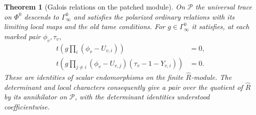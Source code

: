 \documentclass[a4paper,11pt]{article}
\newtheorem{theorem}[proposition]{Theorem}
\theoremstyle{definition}
\theoremstyle{remark}
\numberwithin{equation}{section}
\begin{document}
\begin{theorem}[Galois relations on the patched module]\leavevmode
\label{thm:patchrelations408}
On \(\mathcal P\) the universal trace on \(\Phi^0\) descends
to \(\Gamma_\infty^0\) and satisfies the polarized ordinary
relations with its limiting local maps and the old tame
conditions. For \(g\in\Gamma_\infty^0\) it satisfies, at
each marked pair \(\phi_v,\tau_v\),
\[
 \begin{split}
 t\!\left(g\prod_i(\phi_v-U_{v,i})\right)&=0,\\
 t\!\left(g\prod_{j\ne i}(\phi_v-U_{v,j})
                         (\tau_v-1-Y_{v,i})\right)&=0 .
 \end{split}
\]
These are identities of scalar endomorphisms on the finite
\(\widehat R\)-module. The determinant and local characters
consequently give a pair over the quotient of \(\widehat R\)
by its annihilator on \(\mathcal P\), with the determinant
identities understood coefficientwise.
\end{theorem}
\end{document}
